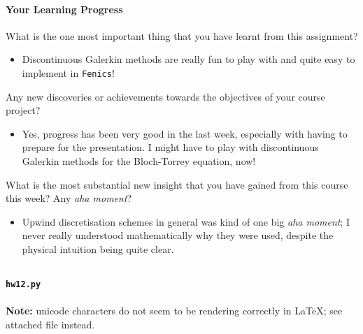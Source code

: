 \newpage
\paragraph*{Your Learning Progress}%

What is the one most important thing that you have learnt from this assignment?

\vspace{0.5cm}
\begin{itemize}
\item Discontinuous Galerkin methods are really fun to play with and quite easy to implement in \texttt{Fenics}!
\end{itemize}

\vspace{0.8cm}
Any new discoveries or achievements towards the objectives of your course project?

\vspace{0.5cm}
\begin{itemize}
\item Yes, progress has been very good in the last week, especially with having to prepare for the presentation.
I might have to play with discontinuous Galerkin methods for the Bloch-Torrey equation, now!
\end{itemize}

\vspace{0.8cm}
What is the most substantial new insight that you have gained from this course this week? Any \emph{aha moment}?

\vspace{0.5cm}
\begin{itemize}
\item Upwind discretisation schemes in general was kind of one big \emph{aha moment}; I never really understood mathematically why they were used, despite the physical intuition being quite clear.
\end{itemize}

\newpage
\begin{appendices}
\newpage
\lhead{}
\section{}\label{hw12code}
\textbf{\Large\texttt{hw12.py}}\\\\
\textbf{Note:} unicode characters do not seem to be rendering correctly in \LaTeX; see attached file instead.
\end{appendices}


